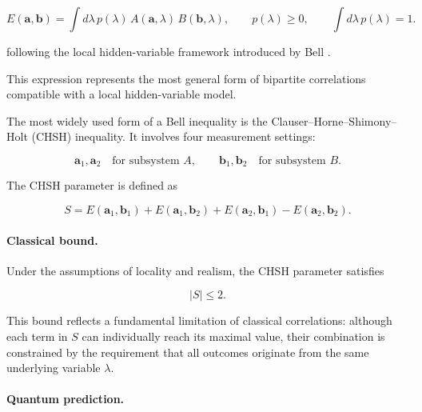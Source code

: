\begin{equation}
E(\mathbf{a},\mathbf{b})
=
\int d\lambda\,
p(\lambda)\,
A(\mathbf{a},\lambda)\,
B(\mathbf{b},\lambda),
\qquad
p(\lambda) \ge 0,
\qquad
\int d\lambda\,p(\lambda)=1.
\label{eq:local_hidden_variable_correlation}
\end{equation}

following the local hidden-variable framework introduced by Bell \cite{bell_epr_paradox_1964}.

\medskip

This expression represents the most general form of bipartite correlations compatible with a local hidden-variable model.

\medskip

The most widely used form of a Bell inequality is the Clauser--Horne--Shimony--Holt (CHSH) inequality. It involves four measurement settings:

\[
\mathbf{a}_1,\mathbf{a}_2
\quad
\text{for subsystem } A,
\qquad
\mathbf{b}_1,\mathbf{b}_2
\quad
\text{for subsystem } B.
\]

The CHSH parameter is defined as

\begin{equation}
S
=
E(\mathbf{a}_1,\mathbf{b}_1)
+
E(\mathbf{a}_1,\mathbf{b}_2)
+
E(\mathbf{a}_2,\mathbf{b}_1)
-
E(\mathbf{a}_2,\mathbf{b}_2).
\label{eq:chsh_parameter}
\end{equation}

\medskip

\paragraph{Classical bound.}

Under the assumptions of locality and realism, the CHSH parameter satisfies

\begin{equation}
|S| \le 2.
\label{eq:chsh_classical_bound}
\end{equation}

This bound reflects a fundamental limitation of classical correlations: although each term in \( S \) can individually reach its maximal value, their combination is constrained by the requirement that all outcomes originate from the same underlying variable \( \lambda \).

\medskip

\paragraph{Quantum prediction.}

